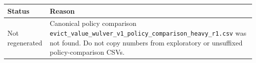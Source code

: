 \begin{tabular}{@{}l p{10.5cm}@{}}
\toprule
\textbf{Status} & \textbf{Reason} \\
\midrule
Not regenerated & Canonical policy comparison \texttt{evict\_value\_wulver\_v1\_policy\_comparison\_heavy\_r1.csv} was not found. Do not copy numbers from exploratory or unsuffixed policy-comparison CSVs. \\
\bottomrule
\end{tabular}
